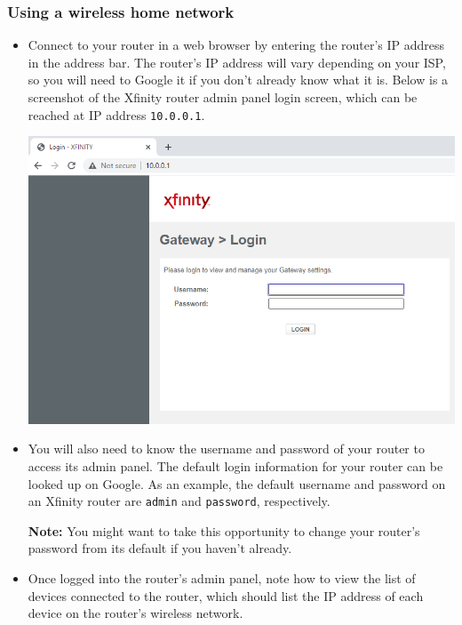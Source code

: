 \documentclass{article}
\begin{document}
\subsubsection{Using a wireless home network}
\begin{itemize}
    \item Connect to your router in a web browser by entering the router's IP address in the address bar. The router's IP address will vary depending on your ISP, so you will need to Google it if you don't already know what it is. Below is a screenshot of the Xfinity router admin panel login screen, which can be reached at IP address \texttt{10.0.0.1}.
    
    \includegraphics[width=\textwidth]{images/router-panel.png}
    
    \item You will also need to know the username and password of your router to access its admin panel. The default login information for your router can be looked up on Google. As an example, the default username and password on an Xfinity router are \texttt{admin} and \texttt{password}, respectively.
    
    \textbf{Note:} You might want to take this opportunity to change your router's password from its default if you haven't already.
    
    \item Once logged into the router's admin panel, note how to view the list of devices connected to the router, which should list the IP address of each device on the router's wireless network.
\end{itemize}
	
\end{document}

